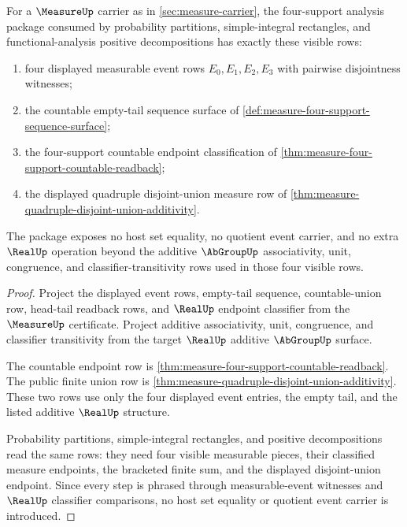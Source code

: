 \begin{theorem}
\label{thm:measure-four-support-analysis-consumer-package}
For a $\MeasureUp$ carrier as in \autoref{sec:measure-carrier}, the
four-support analysis package consumed by probability partitions,
simple-integral rectangles, and functional-analysis positive decompositions
has exactly these visible rows:
\begin{enumerate}
  \item four displayed measurable event rows $E_0,E_1,E_2,E_3$ with pairwise
  disjointness witnesses;
  \item the countable empty-tail sequence surface of
  \autoref{def:measure-four-support-sequence-surface};
  \item the four-support countable endpoint classification of
  \autoref{thm:measure-four-support-countable-readback};
  \item the displayed quadruple disjoint-union measure row of
  \autoref{thm:measure-quadruple-disjoint-union-additivity}.
\end{enumerate}
The package exposes no host set equality, no quotient event carrier, and no
extra $\RealUp$ operation beyond the additive $\AbGroupUp$ associativity, unit,
congruence, and classifier-transitivity rows used in those four visible rows.
\end{theorem}
\begin{proof}
Project the displayed event rows, empty-tail sequence, countable-union row,
head-tail readback rows, and $\RealUp$ endpoint classifier from the
$\MeasureUp$ certificate. Project additive associativity, unit, congruence,
and classifier transitivity from the target $\RealUp$ additive $\AbGroupUp$
surface.

The countable endpoint row is
\autoref{thm:measure-four-support-countable-readback}. The public finite
union row is \autoref{thm:measure-quadruple-disjoint-union-additivity}. These
two rows use only the four displayed event entries, the empty tail, and the
listed additive $\RealUp$ structure.

Probability partitions, simple-integral rectangles, and positive
decompositions read the same rows: they need four visible measurable pieces,
their classified measure endpoints, the bracketed finite sum, and the
displayed disjoint-union endpoint. Since every step is phrased through
measurable-event witnesses and $\RealUp$ classifier comparisons, no host set
equality or quotient event carrier is introduced.
\end{proof}
